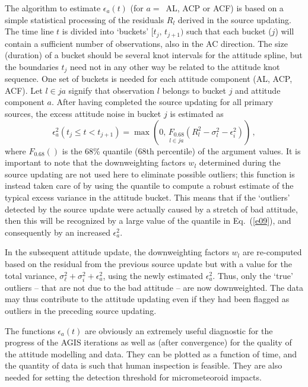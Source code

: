 \documentclass[structabstract]{aa}
\begin{document}
The algorithm to estimate $\epsilon_a(t)$ (for $a=$~AL, ACP or ACF)
is based on a simple statistical processing of the residuals
$R_l$ derived in the source updating.
The time line $t$ is divided into `buckets' $[t_j,\, t_{j+1})$ such that
each bucket ($j$) will contain a sufficient number of observations,
also in the AC direction. The size (duration) of a bucket should be
several knot intervals for the attitude
spline, but the boundaries $t_j$ need not in any other way be related
to the attitude knot sequence. One set of buckets is needed for
each attitude component (AL, ACP, ACF). Let $l\in ja$ signify that
observation $l$ belongs to bucket $j$ and attitude component $a$.
After having completed the source updating for all primary sources, 
the excess attitude noise in bucket $j$ is estimated as
\begin{equation}\label{e09}
\epsilon_a^2(t_j\le t < t_{j+1}) = \max\left(
0,\, \underset{l\in ja}{F_{0.68}}(
R_l^2-\sigma_l^2-\epsilon_i^2)\right) \, ,
\end{equation}
where $F_{0.68}()$ is the 68\% quantile (68th percentile) of the argument values.
It is important to note that the downweighting factors $w_l$
determined during the source updating are not used here to eliminate
possible outliers; this function is instead taken care of by
using the quantile to compute a robust estimate of the typical excess 
variance in the attitude bucket. This means that if the `outliers' detected 
by the source update were actually caused by a stretch of bad attitude,
then this will be recognized by a large value of the quantile in Eq.~(\ref{e09}),
and consequently by an increased $\epsilon_a^2$.

In the subsequent attitude update, the downweighting factors $w_l$
are re-computed based on the residual from the previous source update
but with a value for the total variance,
$\sigma_\ell^2+\sigma_i^2+\epsilon_a^2$, using the newly estimated
$\epsilon_a^2$. Thus, only the `true' outliers -- that are not due to the 
bad attitude -- are now downweighted. The data may thus contribute to 
the attitude updating even if they had been flagged as outliers in the 
preceding source updating. 

The functions $\epsilon_a(t)$ are obviously an extremely useful
diagnostic for the progress of the AGIS iterations as well as
(after convergence) for the quality of the attitude modelling
and data. They can be
plotted as a function of time, and the quantity of data is such
that human inspection is feasible. They are also
needed for setting the detection threshold for micrometeoroid
impacts.
\end{document}
